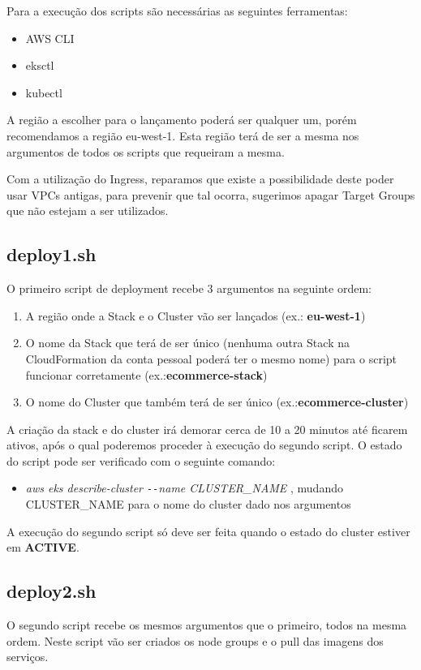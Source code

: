 \documentclass[11pt,a4paper]{article}
\begin{document}
Para a execução dos scripts são necessárias as seguintes ferramentas:
\begin{itemize}
	\item AWS CLI
	\item eksctl
	\item kubectl
\end{itemize}

A região a escolher para o lançamento poderá ser qualquer um, porém recomendamos a região eu-west-1. Esta região terá de ser a mesma nos argumentos de todos os scripts que requeiram a mesma.

Com a utilização do Ingress, reparamos que existe a possibilidade deste poder usar VPCs antigas, para prevenir que tal ocorra, sugerimos apagar Target Groups que não estejam a ser utilizados.

\subsection{deploy1.sh}
O primeiro script de deployment recebe 3 argumentos na seguinte ordem:
\begin{enumerate}
	\item A região onde a Stack e o Cluster vão ser lançados (ex.: \textbf{eu-west-1})
	\item O nome da Stack que terá de ser único (nenhuma outra Stack na CloudFormation da conta pessoal poderá ter o mesmo nome) para o script funcionar corretamente (ex.:\textbf{ecommerce-stack})
	\item O nome do Cluster que também terá de ser único (ex.:\textbf{ecommerce-cluster})
\end{enumerate}

A criação da stack e do cluster irá demorar cerca de 10 a 20 minutos até ficarem ativos, após o qual poderemos proceder à execução do segundo script. O estado do script pode ser verificado com o seguinte comando:
\begin{itemize}
	\item \textit{aws eks describe-cluster \texttt{-{}-}name CLUSTER\_NAME} , mudando CLUSTER\_NAME para o nome do cluster dado nos argumentos
\end{itemize}
A execução do segundo script só deve ser feita quando o estado do cluster estiver em \textbf{ACTIVE}.

\subsection{deploy2.sh}
O segundo script recebe os mesmos argumentos que o primeiro, todos na mesma ordem. Neste script vão ser criados os node groups e o pull das imagens dos serviços.
\end{document}
